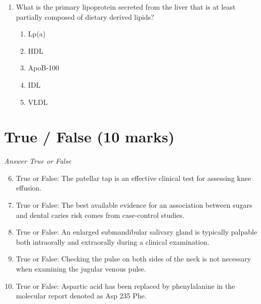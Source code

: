 \documentclass[12pt]{article}
\begin{document}
\begin{enumerate}[label=\arabic*.]
\begin{enumerate}[label=(\alph*)]
    \item arise from the ascending aorta and do not fill during either systole or diastole.
    \item arise from the arch of the aorta and do not fill during either systole or diastole.
    \item arise from the ascending aorta and fill during systole.
    \item arise from the arch of the aorta and fill during systole.
    \item arise from the pulmonary artery and fill during systole.
\end{enumerate}
\item What is the primary lipoprotein secreted from the liver that is at least partially composed of dietary derived lipids?
\begin{enumerate}[label=(\alph*)]
    \item Lp(a)
    \item HDL
    \item ApoB-100
    \item IDL
    \item VLDL
\end{enumerate}
\end{enumerate}

\section*{True / False (10 marks)}
\textit{Answer True or False}
\begin{enumerate}[label=\arabic*.]
\setcounter{enumi}{5}
\item True or False: The patellar tap is an effective clinical test for assessing knee effusion.
\item True or False: The best available evidence for an association between sugars and dental caries risk comes from case-control studies.
\item True or False: An enlarged submandibular salivary gland is typically palpable both intraorally and extraorally during a clinical examination.
\item True or False: Checking the pulse on both sides of the neck is not necessary when examining the jugular venous pulse.
\item True or False: Aspartic acid has been replaced by phenylalanine in the molecular report denoted as Asp 235 Phe.
\end{enumerate}
\end{document}
